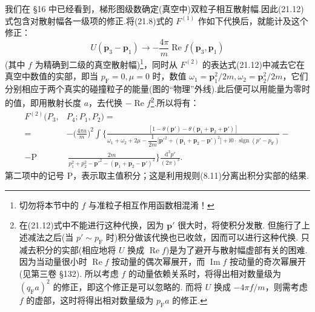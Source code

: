 我们在 §16 中已经看到，梯形图级数确定(真空中)双粒子相互散射幅.因此(21.12)式包含对散射幅各一级项的修正.将(21.8)式的 $F^{(1)}$ 作如下代换后，就能计及这个修正：
\begin{equation*}
  U(\bm{p}_3-\bm{p}_1)\to-\frac{4\pi}{m}\operatorname{Re}f(\bm{p}_3,\bm{p}_1)
\end{equation*}
(其中 $f$ 为精确到二级的真空散射幅)\footnote{切勿将本节中的 $f$ 与准粒子相互作用函数相混淆！}，同时从 $F^{(2)}$ 的表达式(21.12)中减去它在真空中数值的实部，即当 $p_{\mathrm{F}}=0,\mu=0$ 时，数值 $\omega_1=\bm{p}_1^2/2m,\omega_2=\bm{p}_2^2/2m$，它们分别相应于两个真实的碰撞粒子的能量(图的“物理”外线).此后便可以用能量为零时的值，即用散射长度 $a$，去代换 $-\operatorname{Re}f$\footnote{在(21.12)式中不能进行这种代换，因为 $\bm{p}'$ 很大时，将使积分发散. 但施行了上述减法之后(当 $p'\sim p_{\mathrm{F}}$ 时)积分做该代换也已收敛，因而可以进行这种代换. 只减去积分的实部(相应地将 $U$ 换成 $\operatorname{Re}f$)是为了避开与散射幅虚部有关的困难. 因为当动量很小时 $\operatorname{Re}f$ 按动量的偶次幂展开，而 $\operatorname{Im}f$ 按动量的奇次幂展开(见第三卷 §132). 所以考虑 $f$ 的动量依赖关系时，将得出相对数量级为 $(q_{\mathrm{F}}a)^2$ 的修正，即这个修正是可以忽略的. 而将 $U$ 换成 $-4\pi f/m$，则需考虑 $f$ 的虚部，这时将得出相对数量级为 $p_{\mathrm{F}}a$ 的修正.}.所以将有：
\begin{equation}
\begin{aligned}
  F^{(2)}(P_3,&P_4;P_1,P_2)=\\
  ={}&-\biggl(\frac{4\pi a}{m}\biggr)^{\!2}\int\biggl\{\frac{[1-\theta(\bm{p}')-\theta(\bm{p}_1+\bm{p}_2+\bm{p}')]}
  {\omega_1+\omega_2+2\mu-\dfrac{1}{2m}\bigl[\bm{p}'^2+(\bm{p}_1+\bm{p}_2-\bm{p}')^2\bigr]+\mathrm{i}0\cdot\operatorname{sign}(p'-p_{\mathrm{F}})}-\\
  -\mathrm{P}&\,\frac{2m}{p_1^2+p_2^2-\bm{p}'^2-(\bm{p}_1+\bm{p}_2-\bm{p}')^2}\biggr\}\frac{\mathrm{d}^3p'}{(2\pi)^3}.
\end{aligned}
\end{equation}
第二项中的记号 P，表示取主值积分；这是利用规则(8.11)分离出积分实部的结果.

